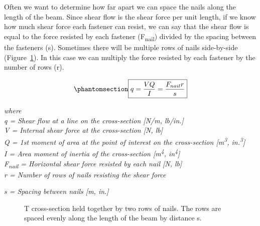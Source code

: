 \documentclass[
  letterpaper,
  DIV=11,
  numbers=noendperiod]{scrreprt}
\theoremstyle{definition}
\theoremstyle{remark}
\begin{document}
Often we want to determine how far apart we can space the nails along
the length of the beam. Since shear flow is the shear force per unit
length, if we know how much shear force each fastener can resist, we can
say that the shear flow is equal to the force resisted by each fastener
(F\textsubscript{nail}) divided by the spacing between the fasteners
(s). Sometimes there will be multiple rows of nails side-by-side
(Figure~\ref{fig-10.12}). In this case we can multiply the force
resisted by each fastener by the number of rows (r).

\begin{equation}\phantomsection\label{eq-10.3}{
\boxed{q=\frac{V Q}{I}=\frac{F_{nail} r}{s}}
}\end{equation}

\emph{where}\\
\emph{q = Shear flow at a line on the cross-section {[}N/m, lb/in.{]}}\\
\emph{V = Internal shear force at the cross-section {[}N, lb{]}}\\
\emph{Q = 1st moment of area at the point of interest on the
cross-section {[}m\textsuperscript{3}, in.\textsuperscript{3}{]}}\\
\emph{I = Area moment of inertia of the cross-section
{[}m\textsuperscript{4}, in\textsuperscript{4}{]}}\\
\emph{F\textsubscript{nail} = Horizontal shear force resisted by each
nail {[}N, lb{]}}\\
\emph{r = Number of rows of nails resisting the shear force}

\emph{s = Spacing between nails {[}m, in.{]}}

\begin{figure}


\caption{\label{fig-10.12}T cross-section held together by two rows of
nails. The rows are spaced evenly along the length of the beam by
distance s.}

\end{figure}%
\end{document}
